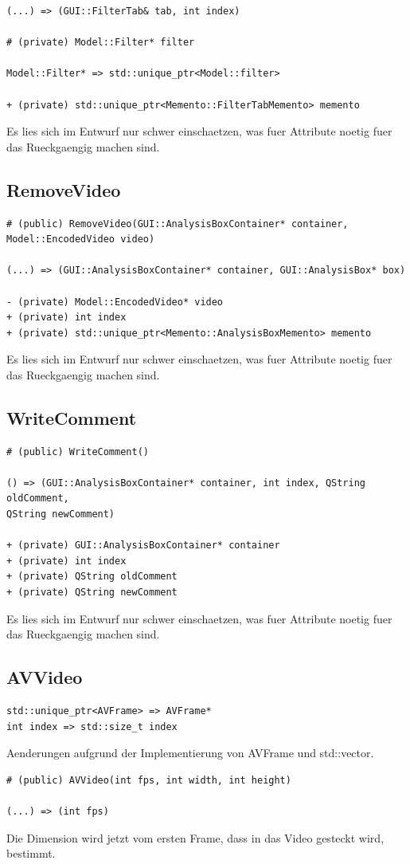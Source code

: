 \documentclass{scrartcl}
\begin{document}
{\begin{verbatim}
(...) => (GUI::FilterTab& tab, int index)

# (private) Model::Filter* filter

Model::Filter* => std::unique_ptr<Model::filter>

+ (private) std::unique_ptr<Memento::FilterTabMemento> memento
\end{verbatim}
Es lies sich im Entwurf nur schwer einschaetzen, was fuer Attribute noetig fuer das Rueckgaengig machen sind.
\subsection{RemoveVideo}
\begin{verbatim}
# (public) RemoveVideo(GUI::AnalysisBoxContainer* container, Model::EncodedVideo video)

(...) => (GUI::AnalysisBoxContainer* container, GUI::AnalysisBox* box)

- (private) Model::EncodedVideo* video
+ (private) int index
+ (private) std::unique_ptr<Memento::AnalysisBoxMemento> memento
\end{verbatim}
Es lies sich im Entwurf nur schwer einschaetzen, was fuer Attribute noetig fuer das Rueckgaengig machen sind.
\subsection{WriteComment}
\begin{verbatim}
# (public) WriteComment()

() => (GUI::AnalysisBoxContainer* container, int index, QString oldComment,
QString newComment)

+ (private) GUI::AnalysisBoxContainer* container
+ (private) int index
+ (private) QString oldComment
+ (private) QString newComment
\end{verbatim}
Es lies sich im Entwurf nur schwer einschaetzen, was fuer Attribute noetig fuer das Rueckgaengig machen sind.
\subsection{AVVideo}
\begin{verbatim}
std::unique_ptr<AVFrame> => AVFrame*
int index => std::size_t index
\end{verbatim}
Aenderungen aufgrund der Implementierung von AVFrame und std::vector.
\begin{verbatim}
# (public) AVVideo(int fps, int width, int height)

(...) => (int fps)
\end{verbatim}
Die Dimension wird jetzt vom ersten Frame, dass in das Video gesteckt wird, bestimmt.

}
\end{document}
